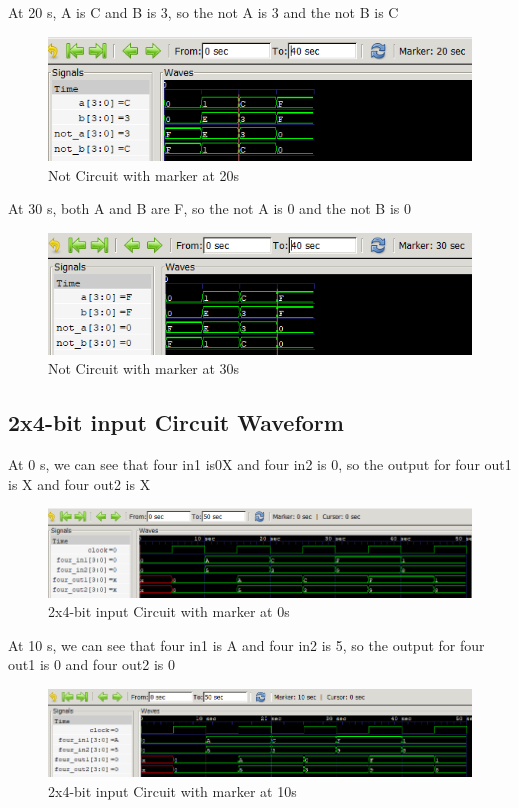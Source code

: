 \documentclass[12pt]{article}
\begin{document}
At 20 s, A is C and B is 3, so the not A is 3 and the not B is C
\begin{figure}[h]
    \centering
    \includegraphics[width = 1.0\textwidth]{figs/Not20.png}
    \caption{Not Circuit with marker at 20s}
    \label{fig:enter-label}
\end{figure}

At 30 s, both A and B are F, so the not A is 0 and the not B is 0
\begin{figure}[h]
    \centering
    \includegraphics[width = 1.0\textwidth]{figs/Not30.png}
    \caption{Not Circuit with marker at 30s}
    \label{fig:enter-label}
\end{figure}




\subsection{2x4-bit input Circuit Waveform}

At 0 s, we can see that four in1 is0X and four in2 is 0, so the output for four out1 is X and four out2 is X
\begin{figure}[h]
    \centering
    \includegraphics[width = 1.0\textwidth]{figs/Input0.png}
    \caption{2x4-bit input Circuit with marker at 0s}
    \label{fig:enter-label}
\end{figure}


At 10 s, we can see that four in1 is A and four in2 is 5, so the output for four out1 is 0 and four out2 is 0
\begin{figure}[h]
    \centering
    \includegraphics[width = 1.0\textwidth]{figs/Input10.png}
    \caption{2x4-bit input Circuit with marker at 10s}
    \label{fig:enter-label}
\end{figure}
\end{document}
